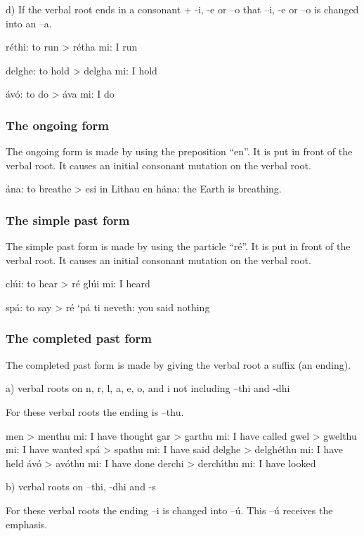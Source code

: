 d) If the verbal root ends in a consonant + -i, -e or –o that –i, -e or –o is changed into an –a.

r\'{e}thi: to run
> r\'{e}tha mi: I run

delghe: to hold
> delgha mi: I hold

\'{a}v\'{o}: to do
> \'{a}va mi: I do

\subsubsection{The ongoing form}

The ongoing form is made by using the preposition “en”. It is put in front of the verbal root. It causes an initial consonant mutation on the verbal root.

\'{a}na: to breathe
> esi in Lithau en h\'{a}na: the Earth is breathing.

\subsubsection{The simple past form}

The simple past form is made by using the particle “r\'{e}”. It is put in front of the verbal root. It causes an initial consonant mutation on the verbal root.

cl\'{u}i: to hear
> r\'{e} gl\'{u}i mi: I heard

sp\'{a}: to say
> r\'{e} ‘p\'{a} ti neveth: you said nothing

\subsubsection{The completed past form}

The completed past form is made by giving the verbal root a suffix (an ending). 

a) verbal roots on n, r, l, a, e, o, and i not including –thi and -dhi

For these verbal roots the ending is –thu.

men > menthu mi: I have thought
gar > garthu mi: I have called
gwel > gwelthu mi: I have wanted
sp\'{a} > spathu mi: I have said
delghe > delgh\'{e}thu mi: I have held
\'{a}v\'{o} > av\'{o}thu mi: I have done
derchi > derch\'{\i}thu mi: I have looked

b) verbal roots on –thi, -dhi and -s

For these verbal roots the ending –i is changed into –\'{u}. This –\'{u} receives the emphasis.

